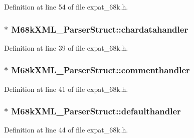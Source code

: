 Definition at line 54 of file expat\+\_\+68k.\+h.

\subsubsection[{\texorpdfstring{chardatahandler}{chardatahandler}}]{$\ast$ M68k\+X\+M\+L\+\_\+\+Parser\+Struct\+::chardatahandler}\hypertarget{struct_m68k_x_m_l___parser_struct_a8abe10bfdc838cda43dcb57b7759121f}{}\label{struct_m68k_x_m_l___parser_struct_a8abe10bfdc838cda43dcb57b7759121f}


Definition at line 39 of file expat\+\_\+68k.\+h.

\subsubsection[{\texorpdfstring{commenthandler}{commenthandler}}]{$\ast$ M68k\+X\+M\+L\+\_\+\+Parser\+Struct\+::commenthandler}\hypertarget{struct_m68k_x_m_l___parser_struct_a04da4fa1731a6c6f1144f1d62de936c9}{}\label{struct_m68k_x_m_l___parser_struct_a04da4fa1731a6c6f1144f1d62de936c9}


Definition at line 41 of file expat\+\_\+68k.\+h.

\subsubsection[{\texorpdfstring{defaulthandler}{defaulthandler}}]{$\ast$ M68k\+X\+M\+L\+\_\+\+Parser\+Struct\+::defaulthandler}\hypertarget{struct_m68k_x_m_l___parser_struct_adf7c7c080272bb95d1ac761aeb5bec5a}{}\label{struct_m68k_x_m_l___parser_struct_adf7c7c080272bb95d1ac761aeb5bec5a}


Definition at line 44 of file expat\+\_\+68k.\+h.

